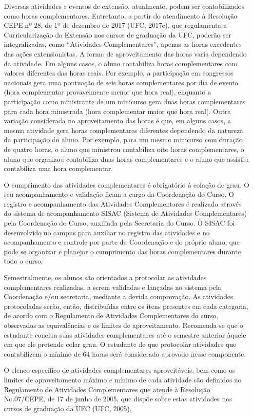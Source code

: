 Diversas atividades e eventos de extensão, atualmente, podem ser contabilizados como horas complementares. Entretanto, a partir do atendimento à Resolução CEPE nº 28, de 1º de dezembro de 2017 (UFC, 2017c), que regulamenta a Curricularização da Extensão nos cursos de graduação da UFC, poderão ser integralizadas, como “Atividades Complementares”, apenas as horas excedentes das ações extensionistas.
A forma de aproveitamento das horas varia dependendo da atividade. Em alguns casos, o aluno contabiliza horas complementares com valores diferentes das horas reais. Por exemplo, a participação em congressos nacionais gera uma pontuação de seis horas complementares por dia de evento (hora complementar provavelmente menor que hora real), enquanto a participação como ministrante de um minicurso gera duas horas complementares para cada hora ministrada (hora complementar maior que hora real). Outra variação considerada no aproveitamento das horas é que, em alguns casos, a mesma atividade gera horas complementares diferentes dependendo da natureza da participação do aluno. Por exemplo, para um mesmo minicurso com duração de quatro horas, o aluno que ministrou contabiliza oito horas complementares, o aluno que organizou contabiliza duas horas complementares e o aluno que assistiu contabiliza uma hora complementar.

O cumprimento das atividades complementares é obrigatório à colação de grau. O seu acompanhamento e validação ficam a cargo da Coordenação do Curso. O registro e acompanhamento das Atividades Complementares é realizado através do sistema de acompanhamento SISAC (Sistema de Atividades Complementares) pela Coordenação do Curso, auxiliada pela Secretaria do Curso. O SISAC foi desenvolvido no campus para auxiliar no registro das atividades e no acompanhamento e controle por parte da Coordenação e do próprio aluno, que pode se organizar e planejar o cumprimento das horas complementares durante todo o curso.

Semestralmente, os alunos são orientados a protocolar as atividades complementares realizadas, a serem validadas e lançadas no sistema pela Coordenação e/ou secretaria, mediante a devida comprovação. As atividades protocoladas serão, então, distribuídas entre os itens presentes em cada categoria, de acordo com o Regulamento de Atividades Complementares do curso, observadas as equivalências e os limites de aproveitamento. Recomenda-se que o estudante conclua suas atividades complementares até o semestre anterior àquele em que ele pretende colar grau. O estudante de \nomedocurso que protocolar atividades que contabilizem o mínimo de 64 horas será considerado aprovado nesse componente.

O elenco específico de atividades complementares aproveitáveis, bem como os limites de aproveitamento máximo e mínimo de cada atividade são definidos no Regulamento de Atividades Complementares que atende à Resolução No.07/CEPE, de 17 de junho de 2005, que dispõe sobre estas atividades nos cursos de graduação da UFC (UFC, 2005).
